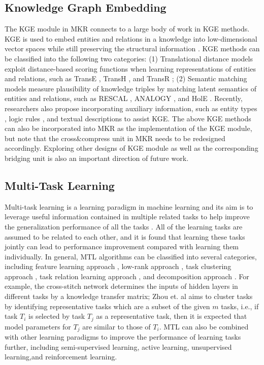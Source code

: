 \documentclass[sigconf]{acmart}
\begin{document}
	\subsection{Knowledge Graph Embedding}
		The KGE module in MKR connects to a large body of work in KGE methods.
		KGE is used to embed entities and relations in a knowledge into low-dimensional vector spaces while still preserving the structural information \cite{wang2017knowledge}.
		KGE methods can be classified into the following two categories:
		(1) Translational distance models exploit distance-based scoring functions when learning representations of entities and relations, such as TransE \cite{bordes2013translating}, TransH \cite{wang2014knowledge}, and TransR \cite{lin2015learning};
		(2) Semantic matching models measure plausibility of knowledge triples by matching latent semantics of entities and relations, such as RESCAL \cite{nickel2011three}, ANALOGY \cite{nickel2016holographic}, and HolE \cite{liu2017analogical}.
		Recently, researchers also propose incorporating auxiliary information, such as entity types \cite{xie2016representation}, logic rules \cite{rocktaschel2015injecting}, and textual descriptions \cite{zhong2015aligning} to assist KGE.
		The above KGE methods can also be incorporated into MKR as the implementation of the KGE module, but note that the cross$\&$compress unit in MKR needs to be redesigned accordingly.
		Exploring other designs of KGE module as well as the corresponding bridging unit is also an important direction of future work.
		
	
	\subsection{Multi-Task Learning}
		Multi-task learning is a learning paradigm in machine learning and its aim is to leverage useful information contained in multiple related tasks to help improve the generalization performance of all the tasks \cite{zhang2017survey}.
		All of the learning tasks are assumed to be related to each other, and it is found that learning these tasks jointly can lead to performance improvement compared with learning them individually.
		In general, MTL algorithms can be classified into several categories, including feature learning approach \cite{zhang2015deep, wang2017deep}, low-rank approach \cite{han2016multi, mcdonald2014spectral}, task clustering approach \cite{zhou2016flexible}, task relation learning approach \cite{lee2016asymmetric}, and decomposition approach \cite{han2015learning}.
		For example, the cross-stitch network \cite{zhang2015deep} determines the inputs of hidden layers in different tasks by a knowledge transfer matrix;
		Zhou et. al \cite{zhou2016flexible} aims to cluster tasks by identifying representative tasks which are a subset of the given $m$ tasks, i.e., if task $T_i$ is selected by task $T_j$ as a representative task, then it is expected that model parameters for $T_j$ are similar to those of $T_i$.
		MTL can also be combined with other learning paradigms to improve the performance of learning tasks further, including semi-supervised learning, active learning, unsupervised learning,and reinforcement learning.
		
\end{document}
